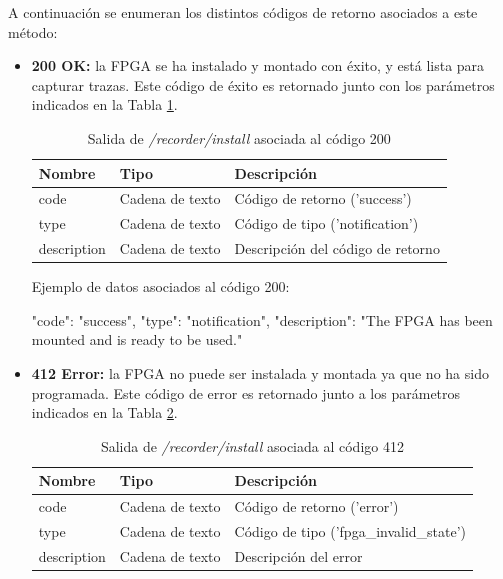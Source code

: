A continuación se enumeran los distintos códigos de retorno asociados a este método:
\begin{itemize}

\item{\textbf{200 OK:} la \gls{FPGA} se ha instalado y montado con éxito, y está lista para capturar \glspl{traza}. Este código de éxito es retornado junto con los parámetros indicados en la Tabla \ref{extra:api:recorderinstall:ok}.
\begin{table}[H]
\centering
\begin{tabular}{|l|l|l|}
\hline
\rowcolor[HTML]{F5F5F5}
\textbf{Nombre}  & \textbf{Tipo}   & \textbf{Descripción}              \\ \hline
code             & Cadena de texto & Código de retorno ('success')     \\ \hline
type             & Cadena de texto & Código de tipo ('notification')   \\ \hline
description      & Cadena de texto & Descripción del código de retorno \\ \hline
\end{tabular}
\caption{Salida de \textit{/recorder/install} asociada al código 200}
\label{extra:api:recorderinstall:ok}
\end{table}
\begin{minipage}{\textwidth}
Ejemplo de datos asociados al código 200:

\begin{code}[language=json]
{
  "code": "success",
  "type": "notification",
  "description": "The FPGA has been mounted and is ready to be used."
}
\end{code}
\end{minipage}
}

\item{\textbf{412 Error:} la \gls{FPGA} no puede ser instalada y montada ya que no ha sido programada. Este código de error es retornado junto a los parámetros indicados en la Tabla \ref{extra:api:recorderinstall:error}.
\begin{table}[H]
\centering
\begin{tabular}{|l|l|l|}
\hline
\rowcolor[HTML]{F5F5F5}
\textbf{Nombre}  & \textbf{Tipo}   & \textbf{Descripción}                    \\ \hline
code             & Cadena de texto & Código de retorno ('error')             \\ \hline
type             & Cadena de texto & Código de tipo ('fpga\_invalid\_state') \\ \hline
description      & Cadena de texto & Descripción del error                   \\ \hline
\end{tabular}
\caption{Salida de \textit{/recorder/install} asociada al código 412}
\label{extra:api:recorderinstall:error}
\end{table}

}
\end{itemize}

